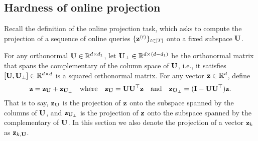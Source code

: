 \subsection{Hardness of online projection}
\label{sec:online-projection}

Recall the definition of the online projection task, which asks to compute the projection of a sequence of online queries $\{\mathbf{z}^{(t)}\}_{t\in [T]}$ onto a fixed subspace $\mathbf{U}$. 



\Onlineprojection*


For any orthonormal $\mathbf{U} \in \mathbb{R}^{d\times d_1}$, let $\mathbf{U}_\perp \in \mathbb{R}^{d\times (d-d_1)}$ be the orthonormal matrix that spans the complementary of the column space of $\mathbf{U}$, i.e., it satisfies $[\mathbf{U}, \mathbf{U}_\perp] \in \mathbb{R}^{d\times d}$ is a squared orthonormal matrix. For any vector $\mathbf{z} \in \mathbb{R}^d$, define 
\begin{align}
\mathbf{z} = \mathbf{z}_{\mathbf{U}} + \mathbf{z}_{\mathbf{U}_\perp} \quad \text{where} \quad \mathbf{z}_{\mathbf{U}} = \mathbf{U}\mathbf{U}^{\top}\mathbf{z} \quad \text{and} \quad \mathbf{z}_{\mathbf{U}_\perp} = (\mathbf{I} - \mathbf{U}\mathbf{U}^{\top})\mathbf{z}.
\end{align}
That is to say, $\mathbf{z}_{\mathbf{U}}$ is the projection of $\mathbf{z}$ onto the subspace spanned by the columns of $\mathbf{U}$, and $\mathbf{z}_{\mathbf{U}_{\perp}}$ is the projection of $\mathbf{z}$ onto the subspace spanned by the complementary of $\mathbf{U}$. In this section we also denote the projection of a vector $\mathbf{z}_{k}$ as $\mathbf{z}_{k, \mathbf{U}}$.



